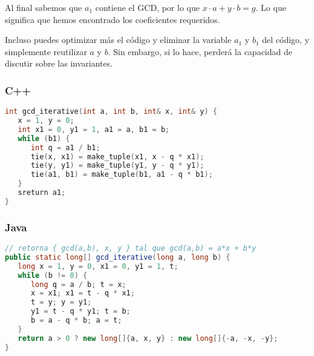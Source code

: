 Al final sabemos que $a_1$ contiene el GCD, por lo que $x \cdot a + y \cdot b = g$. Lo que significa que hemos encontrado los coeficientes requeridos.

Incluso puedes optimizar más el código y eliminar la variable $a_1$ y $b_1$ del código, y simplemente reutilizar $a$ y $b$. Sin embargo, si lo hace, perderá la capacidad de discutir sobre las invariantes.

\subsubsection{C++}
\begin{lstlisting}[language=C++]
int gcd_iterative(int a, int b, int& x, int& y) {
   x = 1, y = 0;
   int x1 = 0, y1 = 1, a1 = a, b1 = b;
   while (b1) {
      int q = a1 / b1;
      tie(x, x1) = make_tuple(x1, x - q * x1);
      tie(y, y1) = make_tuple(y1, y - q * y1);
      tie(a1, b1) = make_tuple(b1, a1 - q * b1);
   }
   sreturn a1;
}
\end{lstlisting}

\subsubsection{Java}
\begin{lstlisting}[language=Java]
// retorna { gcd(a,b), x, y } tal que gcd(a,b) = a*x + b*y
public static long[] gcd_iterative(long a, long b) {
   long x = 1, y = 0, x1 = 0, y1 = 1, t;
   while (b != 0) {
      long q = a / b; t = x;
      x = x1; x1 = t - q * x1;
      t = y; y = y1;
      y1 = t - q * y1; t = b;
      b = a - q * b; a = t;
   }
   return a > 0 ? new long[]{a, x, y} : new long[]{-a, -x, -y};
}
\end{lstlisting}
